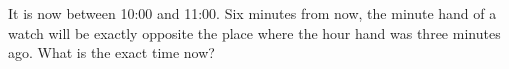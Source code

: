 It is now between 10:00 and 11:00. Six minutes from now, the minute hand of a watch will be exactly opposite the place where the hour hand was three minutes ago. What is the exact time now?
